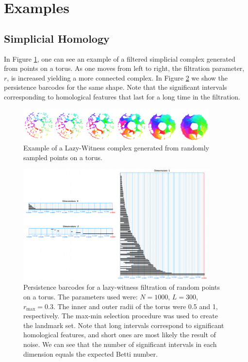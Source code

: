 \documentclass[10pt]{article}
\begin{document}
\section{Examples}

\subsection{Simplicial Homology}

In Figure \ref{lwtorus}, one can see an example of a filtered simplicial complex generated from points on a torus. As one moves from left to right, the filtration parameter, $r$, is increased yielding a more connected complex. In Figure \ref{lwtorusbarcodes} we show the persistence barcodes for the same shape. Note that the significant intervals corresponding to homological features that last for a long time in the filtration.

\begin{figure}
\centering
\includegraphics[width=0.9\textwidth]{images/tori_small.png}
\caption{Example of a Lazy-Witness complex generated from randomly sampled points on a torus.} \label{lwtorus}
\end{figure}

\begin{figure}
\centering
\includegraphics[width=0.9\textwidth]{images/barcodes_small.png}
\caption{Persistence barcodes for a lazy-witness filtration of random points on a torus. The parameters used were: $N = 1000$, $L = 300$, $r_{\max} = 0.3$. The inner and outer radii of the torus were 0.5 and 1, respectively. The max-min selection procedure was used to create the landmark set. Note that long intervals correspond to significant homological features, and short ones are most likely the result of noise. We can see that the number of significant intervals in each dimension equals the expected Betti number.} \label{lwtorusbarcodes}
\end{figure}
\end{document}

